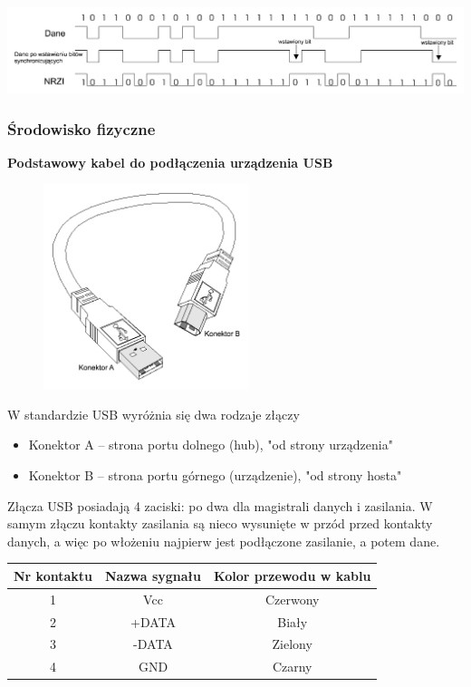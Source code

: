 			\includegraphics[width=15cm]{./wyklady/USB_9_1.pdf}
		\subsubsection{Środowisko fizyczne}
			\textbf{Podstawowy kabel do podłączenia urządzenia USB}\\
			\begin{figure}
				\vspace{-20pt}
				\includegraphics[width=6cm]{./wyklady/USB_10_1.pdf}
			\end{figure}
			W standardzie USB wyróżnia się dwa rodzaje złączy
			\begin{itemize}
				\item Konektor A – strona portu dolnego (hub), "od strony urządzenia"
				\item Konektor B – strona portu górnego (urządzenie), "od strony hosta"
			\end{itemize}
			Złącza USB posiadają 4 zaciski: po dwa dla magistrali danych i zasilania. W samym złączu kontakty zasilania są nieco wysunięte w przód przed kontakty danych, a więc po włożeniu najpierw jest podłączone zasilanie, a potem dane.
			\clearpage
			\begin{table}[H]	%
				\begin{tabular}{|c|c|c|}
					\hline
					\textbf{Nr kontaktu}	& \textbf{Nazwa sygnału}	& \textbf{Kolor przewodu w kablu} \\ \hline
					1 						& Vcc						& Czerwony		\\ \hline
					2 						& +DATA						& Biały			\\ \hline
					3 						& -DATA						& Zielony		\\ \hline
					4 						& GND						& Czarny		\\ \hline
				\end{tabular}
			\end{table}
		
